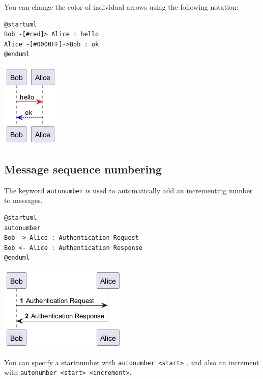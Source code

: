 You can change the color of individual arrows using the following notation:
\begin{verbatim}
@startuml
Bob -[#red]> Alice : hello
Alice -[#0000FF]->Bob : ok
@enduml
\end{verbatim}
\begin{center}
\includegraphics[scale=0.60]{imgw/img-a0b5a4d9c1c477ceec2d11f1b490c0ba.png}
\end{center}


%
%
\subsection{Message sequence numbering}




The keyword \texttt{autonumber} is used to
automatically add an incrementing number to messages.


\begin{verbatim}
@startuml
autonumber
Bob -> Alice : Authentication Request
Bob <- Alice : Authentication Response
@enduml
\end{verbatim}
\begin{center}
\includegraphics[scale=0.60]{imgw/img-798952cd30f576175cca17a4075180d9.png}
\end{center}


You can specify a startnumber with \texttt{autonumber <start>} , and
also an increment with \texttt{autonumber <start> <increment>}.




